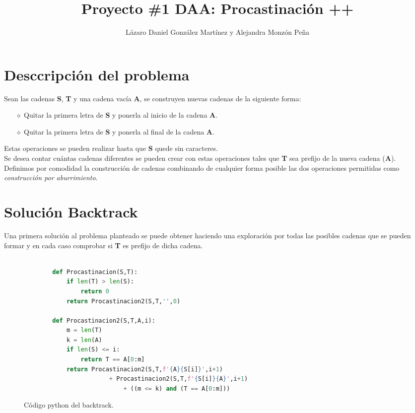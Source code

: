 \documentclass[a4paper]{article}
\begin{document}
    \title{\textbf{Proyecto \#1 DAA:} Procastinaci\'on ++}
    \author{L\'azaro Daniel Gonz\'alez Mart\'inez y Alejandra Monz\'on Pe\~na}
    \date{}
    \maketitle

    \section*{Desccripci\'on del problema}
    Sean las cadenas \textbf{S}, \textbf{T} y una cadena vac\'ia \textbf{A}, se construyen nuevas cadenas de la siguiente forma: 

    \begin{itemize}
        \item[$\diamond $] Quitar la primera letra de \textbf{S} y ponerla al inicio de la cadena \textbf{A}.
        \item[$\diamond $] Quitar la primera letra de \textbf{S} y ponerla al final de la cadena \textbf{A}.    
    \end{itemize}

    Estas operaciones se pueden realizar hasta que \textbf{S} quede sin caracteres.\\ 

    Se desea contar cuántas cadenas diferentes se pueden crear con estas operaciones tales que \textbf{T} sea prefijo de 
    la nueva cadena (\textbf{A}).\\ 

    Definimos por comodidad la construcci\'on de cadenas combinando de cualquier forma posible las dos operaciones permitidas como 
    \textit{construcci\'on por aburrimiento}.

    \section*{Soluci\'on Backtrack}
    Una primera soluci\'on al problema planteado se puede obtener haciendo una exploraci\'on por todas las posibles cadenas que se pueden formar 
    y en cada caso comprobar si \textbf{T} es prefijo de dicha cadena. 


	\begin{figure}[htb]
	
    \begin{lstlisting}[language=Python]

        def Procastinacion(S,T):
            if len(T) > len(S):
                return 0
            return Procastinacion2(S,T,'',0)
        
        def Procastinacion2(S,T,A,i):
            m = len(T)
            k = len(A)
            if len(S) <= i:
                return T == A[0:m]
            return Procastinacion2(S,T,f'{A}{S[i]}',i+1) 
                        + Procastinacion2(S,T,f'{S[i]}{A}',i+1) 
                            + ((m <= k) and (T == A[0:m]))
	\end{lstlisting}
	\caption{Código python del backtrack.}
	\end{figure}
\end{document}
